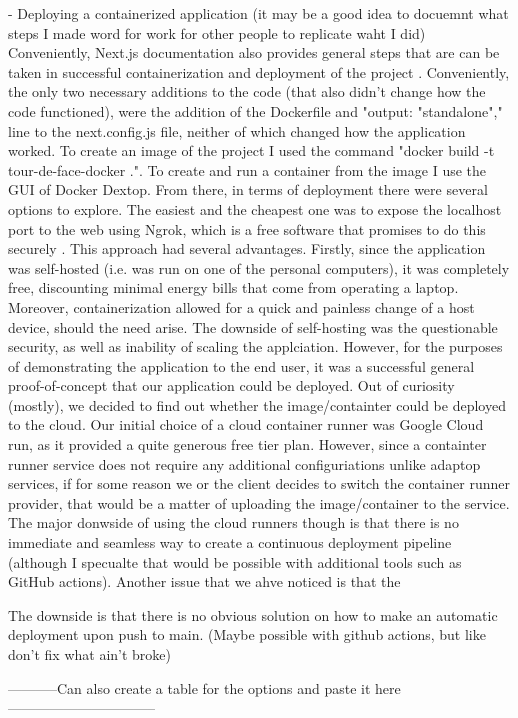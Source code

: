 - Deploying a containerized application (it may be a good idea to docuemnt what steps I made word for work for other people to replicate waht I did)
Conveniently, Next.js documentation also provides general steps that are can be taken in successful containerization and deployment of the project \cite{vercelMainDeploymentMainPage}\cite{next.js/examples/with-docker}. Conveniently, the only two necessary additions to the code (that also didn't change how the code functioned), were the addition of the Dockerfile \cite{next.js/examples/with-docker/Dockerfile} and "output: "standalone"," line to the next.config.js file, neither of which changed how the application worked. To create an image of the project I used the command "docker build -t tour-de-face-docker .". To create and run a container from the image I use the GUI of Docker Dextop. From there, in terms of deployment there were several options to explore. The easiest and the cheapest one was to expose the localhost port to the web using Ngrok, which is a free software that promises to do this securely \cite{ngrokMain} \cite{ngrokMainDocs}. This approach had several advantages. Firstly, since the application was self-hosted (i.e. was run on one of the personal computers), it was completely free, discounting minimal energy bills that come from operating a laptop. Moreover, containerization allowed for a quick and painless change of a host device, should the need arise. The downside of self-hosting was the questionable security, as well as inability of scaling the applciation. However, for the purposes of demonstrating the application to the end user, it was a successful general proof-of-concept that our application could be deployed. Out of curiosity (mostly), we decided to find out whether the image/containter could be deployed to the cloud. Our initial choice of a cloud container runner was Google Cloud run, as it provided a quite generous free tier plan. However, since a containter runner service does not require any additional configuriations unlike adaptop services, if for some reason we or the client decides to switch the container runner provider, that would be a matter of uploading the image/container to the service. The major donwside of using the cloud runners though is that there is no immediate and seamless way to create a continuous deployment pipeline (although I specualte that would be possible with additional tools such as GitHub actions). Another issue that we ahve noticed is that the 

The downside is that there is no obvious solution on how to make an automatic deployment upon push to main. (Maybe possible with github actions, but like don't fix what ain't broke)

-----------Can also create a table for the options and paste it here--------------------------------

